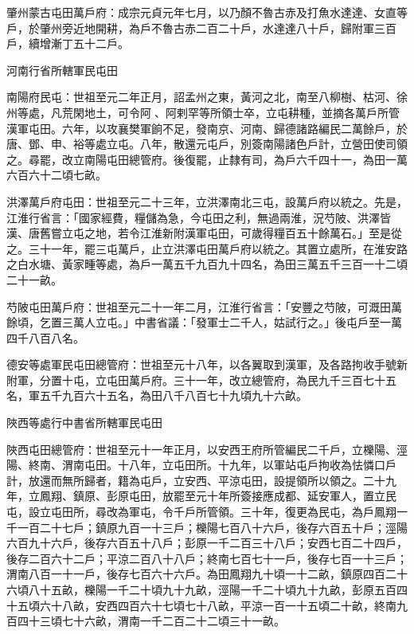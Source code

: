 \begin{pinyinscope}
 肇州蒙古屯田萬戶府：成宗元貞元年七月，以乃顏不魯古赤及打魚水達達、女直等戶，於肇州旁近地開耕，為戶不魯古赤二百二十戶，水達達八十戶，歸附軍三百戶，續增漸丁五十二戶。



 河南行省所轄軍民屯田



 南陽府民屯：世祖至元二年正月，詔孟州之東，黃河之北，南至八柳樹、枯河、徐州等處，凡荒閑地土，可令阿、阿剌罕等所領士卒，立屯耕種，並摘各萬戶所管漢軍屯田。六年，以攻襄樊軍餉不足，發南京、河南、歸德諸路編民二萬餘戶，於唐、鄧、申、裕等處立屯。八年，散還元屯戶，別簽南陽諸色戶計，立營田使司領之。尋罷，改立南陽屯田總管府。後復罷，止隸有司，為戶六千四十一，為田一萬六百六十二頃七畝。



 洪澤萬戶府屯田：世祖至元二十三年，立洪澤南北三屯，設萬戶府以統之。先是，江淮行省言：「國家經費，糧儲為急，今屯田之利，無過兩淮，況芍陂、洪澤皆漢、唐舊嘗立屯之地，若令江淮新附漢軍屯田，可歲得糧百五十餘萬石。」至是從之。三十一年，罷三屯萬戶，止立洪澤屯田萬戶府以統之。其置立處所，在淮安路之白水塘、黃家畽等處，為戶一萬五千九百九十四名，為田三萬五千三百一十二頃二十一畝。



 芍陂屯田萬戶府：世祖至元二十一年二月，江淮行省言：「安豐之芍陂，可溉田萬餘頃，乞置三萬人立屯。」中書省議：「發軍士二千人，姑試行之。」後屯戶至一萬四千八百八名。



 德安等處軍民屯田總管府：世祖至元十八年，以各翼取到漢軍，及各路拘收手號新附軍，分置十屯，立屯田萬戶府。三十一年，改立總管府，為民九千三百七十五名，軍五千九百六十五名，為田八千八百七十九頃九十六畝。



 陜西等處行中書省所轄軍民屯田



 陜西屯田總管府：世祖至元十一年正月，以安西王府所管編民二千戶，立櫟陽、涇陽、終南、渭南屯田。十八年，立屯田所。十九年，以軍站屯戶拘收為怯憐口戶計，放還而無所歸者，籍為屯戶，立安西、平涼屯田，設提領所以領之。二十九年，立鳳翔、鎮原、彭原屯田，放罷至元十年所簽接應成都、延安軍人，置立民屯，設立屯田所，尋改為軍屯，令千戶所管領。三十年，復更為民屯，為戶鳳翔一千一百二十七戶；鎮原九百一十三戶；櫟陽七百八十六戶，後存六百五十戶；涇陽六百九十六戶，後存六百五十八戶；彭原一千二百三十八戶；安西七百二十四戶，後存二百六十二戶；平涼二百八十八戶；終南七百七十一戶，後存七百一十三戶；渭南八百一十一戶，後存七百六十六戶。為田鳳翔九十頃一十二畝，鎮原四百二十六頃八十五畝，櫟陽一千二十頃九十九畝，涇陽一千二十頃九十九畝，彭原五百四十五頃六十八畝，安西四百六十七頃七十八畝，平涼一百一十五頃二十畝，終南九百四十三頃七十六畝，渭南一千二百二十二頃三十一畝。




\end{pinyinscope}
